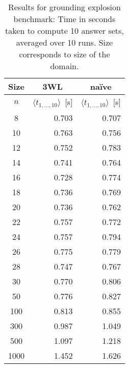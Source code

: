 \documentclass{vutinfth} %
\begin{document}
\begin{table}
\begin{center}
\begin{tabular}{|c||r|r|}
\hline
Size & \multicolumn{1}{c|}{3WL} & \multicolumn{1}{c|}{na\"{i}ve} \\ 
\hline
$n$ & $\langle t_{1, \ldots, 10} \rangle$~[s]& $\langle t_{1, \ldots, 10} \rangle$~[s]\\
\hline
\hline
   8 & 	  0.703 &	  0.707 \\
  10 & 	  0.763 &	  0.756 \\
  12 & 	  0.752 &	  0.783 \\
  14 & 	  0.741 &	  0.764 \\
  16 & 	  0.728 &	  0.774 \\
  18 & 	  0.736 &	  0.769 \\
  20 & 	  0.736 &	  0.762 \\
  22 & 	  0.757 &	  0.772 \\
  24 & 	  0.757 &	  0.794 \\
  26 & 	  0.775 &	  0.779 \\
  28 & 	  0.747 &	  0.767 \\
  30 & 	  0.770 &	  0.806 \\
  50 & 	  0.776 &	  0.827 \\
 100 & 	  0.813 &	  0.855 \\
 300 & 	  0.987 &	  1.049 \\
 500 & 	  1.097 &	  1.218 \\
1000 & 	  1.452 &	  1.626 \\
\hline
\end{tabular}
\end{center}
\caption[Results for grounding explosion benchmark]{Results for grounding explosion benchmark: Time in seconds taken to compute 10 answer sets, averaged over 10 runs. Size corresponds to size of the domain.}
\label{tbl:gex}
\end{table}
\end{document}
